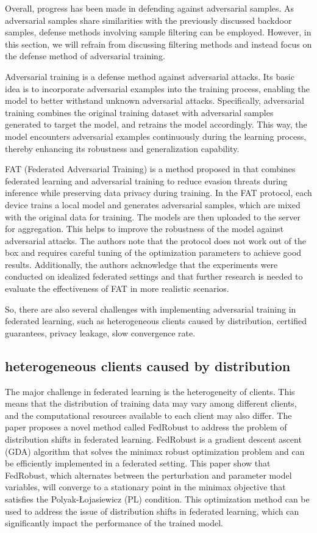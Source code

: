 \documentclass[conference]{IEEEtran}
\begin{document}
Overall, progress has been made in defending against adversarial samples.
As adversarial samples share similarities with the previously discussed backdoor
samples, defense methods involving sample filtering can be employed.
However, in this section, we will refrain from discussing filtering methods
and instead focus on the defense method of adversarial training.

Adversarial training is a defense method against adversarial attacks.
Its basic idea is to incorporate adversarial examples into the training process,
enabling the model to better withstand unknown adversarial attacks.
Specifically, adversarial training combines the original training dataset
with adversarial samples generated to target the model, and retrains the
model accordingly. This way, the model encounters adversarial examples
continuously during the learning process, thereby enhancing its robustness
and generalization capability.

FAT (Federated Adversarial Training) is a method proposed in \cite{b31} that
combines federated learning and adversarial training to reduce evasion
threats during inference while preserving data privacy during training.
In the FAT protocol, each device trains a local model and generates adversarial
samples, which are mixed with the original data for training.
The models are then uploaded to the server for aggregation.
This helps to improve the robustness of the model against adversarial attacks.
The authors note that the protocol does not work out of the box and requires careful
tuning of the optimization parameters to achieve good results. Additionally, the authors
acknowledge that the experiments were conducted on idealized federated settings and that
further research is needed to evaluate the effectiveness of FAT in more realistic scenarios.

So, there are also several challenges with implementing adversarial training in federated learning,
such as heterogeneous clients caused by distribution, certified guarantees, privacy leakage, slow convergence rate.


\subsection{heterogeneous clients caused by distribution}  
The major challenge in federated learning is the heterogeneity of clients.  
This means that the distribution of training data may vary among different clients, 
and the computational resources available to each client may also differ.
The paper\cite{b101} proposes a novel method called FedRobust to address the problem of
distribution shifts in federated learning. FedRobust is a gradient descent ascent
(GDA) algorithm that solves the minimax robust optimization problem and can be
efficiently implemented in a federated setting. This paper show that FedRobust,
which alternates between the perturbation and parameter model variables,
will converge to a stationary point in the minimax objective that satisfies
the Polyak-Łojasiewicz (PL) \cite{b102} condition. This optimization method can be used
to address the issue of distribution shifts in federated learning,
which can significantly impact the performance of the trained model.
\end{document}
